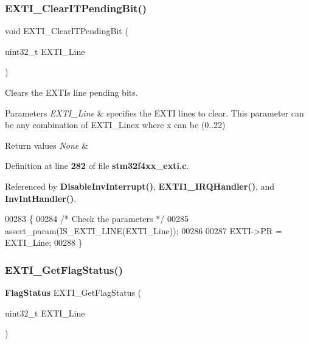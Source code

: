 \subsubsection{E\+X\+T\+I\+\_\+\+Clear\+I\+T\+Pending\+Bit()}
{\footnotesize\ttfamily void E\+X\+T\+I\+\_\+\+Clear\+I\+T\+Pending\+Bit (\begin{DoxyParamCaption}\item[{uint32\+\_\+t}]{E\+X\+T\+I\+\_\+\+Line }\end{DoxyParamCaption})}



Clears the E\+X\+TI\textquotesingle{}s line pending bits. 


\begin{DoxyParams}{Parameters}
{\em E\+X\+T\+I\+\_\+\+Line} & specifies the E\+X\+TI lines to clear. This parameter can be any combination of E\+X\+T\+I\+\_\+\+Linex where x can be (0..22) \\
\hline
\end{DoxyParams}

\begin{DoxyRetVals}{Return values}
{\em None} & \\
\hline
\end{DoxyRetVals}


Definition at line \textbf{ 282} of file \textbf{ stm32f4xx\+\_\+exti.\+c}.



Referenced by \textbf{ Disable\+Inv\+Interrupt()}, \textbf{ E\+X\+T\+I1\+\_\+\+I\+R\+Q\+Handler()}, and \textbf{ Inv\+Int\+Handler()}.


\begin{DoxyCode}
00283 \{
00284   \textcolor{comment}{/* Check the parameters */}
00285   assert_param(IS_EXTI_LINE(EXTI\_Line));
00286   
00287   EXTI->PR = EXTI\_Line;
00288 \}
\end{DoxyCode}
\mbox{\label{group__EXTI__Group2_ga0ce06e6b312592df149800d63218cffa}} 
\subsubsection{E\+X\+T\+I\+\_\+\+Get\+Flag\+Status()}
{\footnotesize\ttfamily \textbf{ Flag\+Status} E\+X\+T\+I\+\_\+\+Get\+Flag\+Status (\begin{DoxyParamCaption}\item[{uint32\+\_\+t}]{E\+X\+T\+I\+\_\+\+Line }\end{DoxyParamCaption})}



